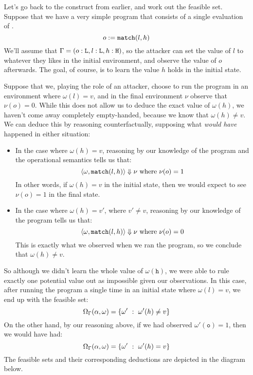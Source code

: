 \documentclass[11pt,twoside]{scrartcl}
\begin{document}
\begin{example}
Let's go back to the  construct from earlier, and work out the feasible set. Suppose that we have a very simple program that consists of a single evaluation of .
\begin{equation}
o := \texttt{\upshape match}(l,h)
\end{equation}
We'll assume that $\Gamma = (o : \texttt{\upshape L}, l : \texttt{\upshape L}, h : \texttt{\upshape H})$, so the attacker can set the value of $l$ to whatever they likes in the initial environment, and observe the value of $o$ afterwards. The goal, of course, is to learn the value $h$ holds in the initial state.

Suppose that we, playing the role of an attacker, choose to run the program in an environment where $\omega(l) = v$, and in the final environment $\nu$ observe that $\nu(o) = 0$. While this does not allow us to deduce the exact value of $\omega(h)$, we haven't come away completely empty-handed, because we know that $\omega(h) \ne v$. We can deduce this by reasoning counterfactually, supposing what \emph{would have} happened in either situation:
\begin{itemize}
\item In the case where $\omega(h) = v$, reasoning by our knowledge of the program and the operational semantics tells us that:
\[
\langle \omega, \texttt{\upshape match}(l, h) \rangle \Downarrow \nu~\text{where}~\nu(o)=1
\]
In other words, if $\omega(h) = v$ in the initial state, then we would expect to see $\nu(o) = 1$ in the final state.

\item In the case where $\omega(h) = v'$, where $v' \ne v$, reasoning by our knowledge of the program tells us that:
\[
\langle \omega, \texttt{\upshape match}(l,h) \rangle \Downarrow \nu~\text{where}~\nu(o)=0
\]
This is exactly what we observed when we ran the program, so we conclude that $\omega(h) \ne v$.
\end{itemize}
So although we didn't learn the whole value of $\omega(\mathtt{h})$, we were able to rule exactly one potential value out as impossible given our observations. In this case, after running the program a single time in an initial state where $\omega(l) = v$, we end up with the feasible set:
\[
\Omega_\Gamma(\alpha,\omega) = 
\{
\omega' ~\mathrel{\mathop{:}}~ \omega'(h) \ne v
\}
\]
On the other hand, by our reasoning above, if we had observed $\omega'(\mathtt{o}) = 1$, then we would have had:
\[
\Omega_\Gamma(\alpha,\omega) = 
\{
\omega' ~\mathrel{\mathop{:}}~ \omega'(h) = v
\}
\]
The feasible sets and their corresponding deductions are depicted in the diagram below.
\begin{center}
\end{center}
\end{example}
\end{document}

